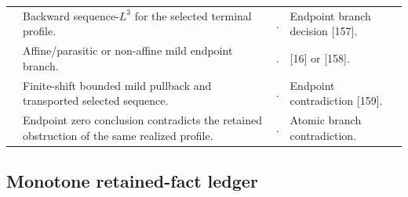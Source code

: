 \documentclass[11pt]{amsart}
\numberwithin{equation}{section}
\theoremstyle{plain}
\theoremstyle{definition}
\theoremstyle{remark}
\begin{document}
\begin{longtable}{@{}L{0.06\textwidth}L{0.25\textwidth}L{0.40\textwidth}L{0.21\textwidth}@{}}
\relax
[156] & Backward sequence-\(L^3\) for the selected terminal profile. &
. &
Endpoint branch decision [157].\\
\relax
[157] & Affine/parasitic or non-affine mild endpoint branch. &
. &
[16] or [158].\\
\relax
[158] & Finite-shift bounded mild pullback and transported selected sequence. &
. &
Endpoint contradiction [159].\\
\relax
[159] & Endpoint zero conclusion contradicts the retained obstruction of the
same realized profile. &
. &
Atomic branch contradiction.\\
\hline
\end{longtable}
\endgroup

\subsection{Monotone retained-fact ledger}
\end{document}
